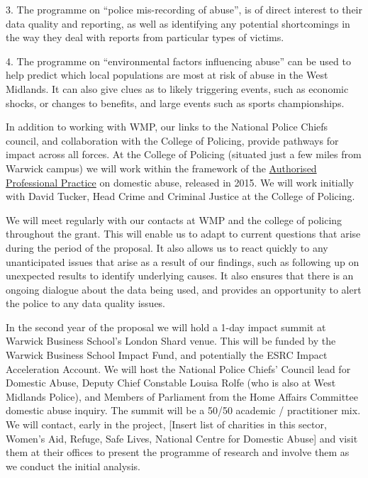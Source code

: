 \documentclass[11pt, a4paper]{article}
\begin{document}
3. The programme on ``police mis-recording of abuse'', is of direct interest to their data quality and reporting, as well as identifying any potential shortcomings in the way they deal with reports from particular types of victims. 

4. The programme on ``environmental factors influencing abuse'' can be used to help predict which local populations are most at risk of abuse in the West Midlands. It can also give clues as to likely triggering events, such as economic shocks, or changes to benefits, and large events such as sports championships.

In addition to working with WMP, our links to the National Police Chiefs council, and collaboration with the College of Policing, provide pathways for impact across all forces. At the College of Policing (situated just a few miles from Warwick campus) we will work within the framework of the \href{https://www.app.college.police.uk/app-content/major-investigation-and-public-protection/domestic-abuse/introduction/) and the revision of the existing DASH risk assessment tool for domestic abuse. (https://whatworks.college.police.uk/Research/Documents/DA_risk_assessment_pilot.pdf}{Authorised Professional Practice} on domestic abuse, released in 2015. We will work initially with David Tucker, Head Crime and Criminal Justice at the College of Policing.

We will meet regularly with our contacts at WMP and the college of policing throughout the grant. This will enable us to adapt to current questions that arise during the period of the proposal. It also allows us to react quickly to any unanticipated issues that arise as a result of our findings, such as following up on unexpected results to identify underlying causes. It also ensures that there is an ongoing dialogue about the data being used, and provides an opportunity to alert the police to any data quality issues.


In the second year of the proposal we will hold a 1-day impact summit at Warwick Business School's London Shard venue. This will be funded by the Warwick Business School Impact Fund, and potentially the ESRC Impact Acceleration Account. We will host the National Police Chiefs' Council lead for Domestic Abuse, Deputy Chief Constable Louisa Rolfe (who is also at West Midlands Police), and Members of Parliament from the Home Affairs Committee domestic abuse inquiry. The summit will be a 50/50 academic / practitioner mix. We will contact, early in the project, [Insert list of charities in this sector, Women's Aid, Refuge, Safe Lives, National Centre for Domestic Abuse] and visit them at their offices to present the programme of research and involve them as we conduct the initial analysis.
\end{document}
